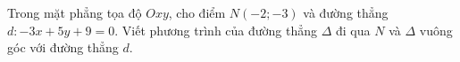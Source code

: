 \begin{bt}%
Trong mặt phẳng tọa độ $Oxy$, cho điểm $N(-2 ;-3)$ và đường thẳng $d\colon-3x+5y+9=0$. Viết phương trình của đường thẳng $\Delta$ đi qua $N$ và $\Delta$ vuông góc với đường thẳng $d$.
\end{bt}

